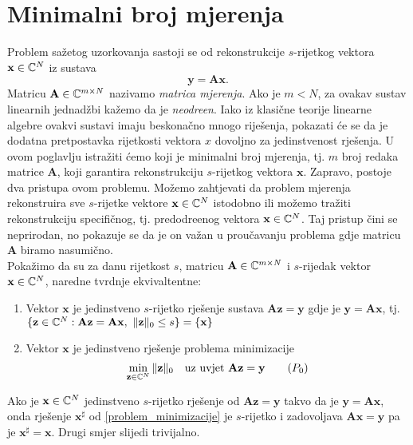 \documentclass[a4paper,twoside,12pt]{memoir} %
\newcommand{\vect}[1]{\mathbf{#1}}
\renewcommand{\vec}{\vect}
\newcommand{\norm}[1]{\|{#1}\|}
\begin{document}
\section[Minimalni broj mjerenja][Minimalni broj mjerenja]{Minimalni broj mjerenja}
Problem sa\v{z}etog uzorkovanja sastoji se od rekonstrukcije $s$-rijetkog vektora $\vec{x} \in \C^N$ iz sustava
\[\vec{y} = \vec{A}\vec{x}.\]
Matricu $\vec{A} \in \C^{m\times N}$ nazivamo \textit{matrica mjerenja}. Ako je $m < N$, za ovakav sustav linearnih jednad\v{z}bi ka\v{z}emo da je \textit{neodre\dj en}. Iako iz klasi\v{c}ne teorije linearne algebre ovakvi sustavi imaju beskona\v{c}no mnogo rije\v{s}enja, pokazati \'ce se da je dodatna pretpostavka rijetkosti vektora $x$ dovoljno za jedinstvenost rje\v{s}enja. U ovom poglavlju istra\v{z}iti \'cemo koji je minimalni broj mjerenja, tj. $m$ broj redaka matrice $\vec{A}$, koji garantira rekonstrukciju $s$-rijetkog vektora $\vec{x}$. Zapravo, postoje dva pristupa ovom problemu. Mo\v{z}emo zahtjevati da problem mjerenja rekonstruira sve $s$-rijetke vektore $\vec{x} \in \C^N$ istodobno ili mo\v{z}emo tra\v{z}iti rekonstrukciju specifi\v{c}nog, tj. predodre\dj enog vektora $\vec{x} \in \C^N$. Taj pristup \v{c}ini se neprirodan, no pokazuje se da je on va\v{z}an u prou\v{c}avanju problema gdje matricu $\vec{A}$ biramo nasumi\v{c}no. \\ 
\indent Poka\v{z}imo da su za danu rijetkost $s$, matricu $\vec{A} \in \C^{m \times N}$ i $s$-rijedak vektor $\vec{x} \in \C^N$, naredne tvrdnje ekvivaltentne: 
\begin{enumerate}
    \item Vektor $\vec{x}$ je jedinstveno $s$-rijetko rje\v{s}enje sustava $\vec{A}\vec{z}=\vec{y}$ gdje je $\vec{y} = \vec{Ax}$, tj. $\{\vec{z} \in \C^N : \vec{A}\vec{z}= \vec{A}\vec{x},\ \norm{\vec{z}}_0 \leq s\} = \{\vec{x}\}$
    \item Vektor $\vec{x}$ je jedinstveno rje\v{s}enje problema minimizacije
        \begin{equation}\label{problem_minimizacije}
            \min\limits_{\vec{z} \in \C^N} \norm{\vec{z}}_0\quad \text{uz uvjet}\ \vec{Az} = \vec y \tag{$P_{0}$}
        \end{equation}
\end{enumerate}
Ako je $\vec{x} \in \C^N$ jedinstveno $s$-rijetko rje\v{s}enje od $\vec{Az} = \vec y$ takvo da je $\vec y = \vec{Ax}$, onda rje\v{s}enje $\vec x^{\sharp}$ od \eqref{problem_minimizacije} je $s$-rijetko i zadovoljava $\vec{Ax} = \vec y$ pa je $\vec x^\sharp = \vec x$. Drugi smjer slijedi trivijalno.
\end{document}
